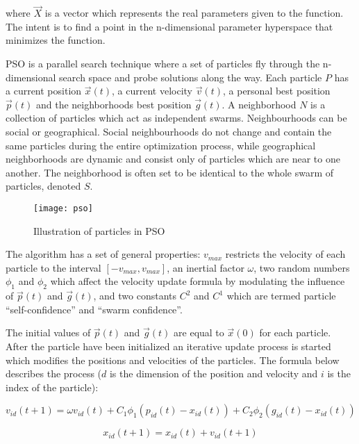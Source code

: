 where $\vec{X}$ is a vector which represents the real parameters given to the function. The intent is to find a point in the n-dimensional parameter hyperspace that minimizes the function.

PSO is a parallel search technique where a set of particles  fly through the n-dimensional search space and probe solutions along the way. Each particle $P$ has a current position $\vec{x}(t)$, a current velocity $\vec{v}(t)$, a personal best position $\vec{p}(t)$ and the neighborhoods best position $\vec{g}(t)$. A neighborhood $N$ is a collection of particles which act as independent swarms. Neighbourhoods can be social or geographical. Social neighbourhoods do not change and contain the same particles during the entire optimization process, while geographical neighborhoods are dynamic and consist only of particles which are near to one another. The neighborhood is often set to be identical to the whole swarm of particles, denoted $S$.

\begin{figure}[H]
  \centering
  \texttt{[image: pso]}
  \caption{Illustration of particles in PSO}
  \label{fig:pso}
\end{figure}

The algorithm has a set of general properties: $v_{max}$ restricts the velocity of each particle to the interval $[-v_{max},v_{max}]$, an inertial factor $\omega$, two random numbers $\phi_1$ and $\phi_2$ which affect the velocity update formula by modulating the influence of $\vec{p}(t)$ and $\vec{g}(t)$, and two constants $C^2$ and $C^1$ which are termed particle “self-confidence” and “swarm confidence”.

The initial values of $\vec{p}(t)$ and $\vec{g}(t)$ are equal to $\vec{x}(0)$ for each particle. After the particle have been initialized an iterative update process is started which modifies the positions and velocities of the particles. The formula below describes the process ($d$ is the dimension of the position and velocity and $i$ is the index of the particle):

\begin{equation}
  v_{id} (t+1) = \omega v_{id} (t) + C_1 \phi_1 (p_{id} (t) - x_{id} (t)) + C_2 \phi_2 (g_{id} (t) - x_{id} (t))
\end{equation}

\begin{equation}
  x_{id} (t+1) = x_{id} (t) + v_{id} (t+1)
\end{equation}

